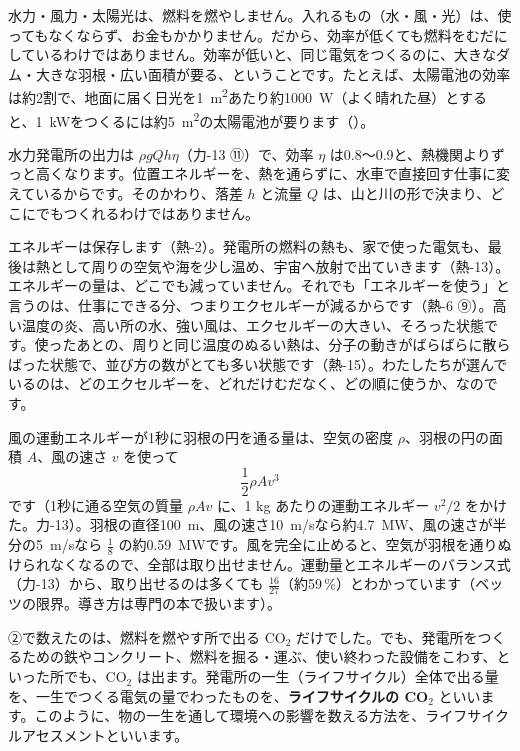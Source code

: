 水力・風力・太陽光は、燃料を燃やしません。入れるもの（水・風・光）は、使ってもなくならず、お金もかかりません。だから、効率が低くても燃料をむだにしているわけではありません。効率が低いと、同じ電気をつくるのに、大きなダム・大きな羽根・広い面積が要る、ということです。たとえば、太陽電池の効率は約2割で、地面に届く日光を\qty{1}{m^2}あたり約\qty{1000}{W}（よく晴れた昼）とすると、\qty{1}{kW}をつくるには約\qty{5}{m^2}の太陽電池が要ります（）。
\begin{phmijika}
水力発電所の出力は $\rho gQh\eta$（力-13 ⑪）で、効率 $\eta$ は0.8〜0.9と、熱機関よりずっと高くなります。位置エネルギーを、熱を通らずに、水車で直接回す仕事に変えているからです。そのかわり、落差 $h$ と流量 $Q$ は、山と川の形で決まり、どこにでもつくれるわけではありません。
\end{phmijika}

エネルギーは保存します（熱-2）。発電所の燃料の熱も、家で使った電気も、最後は熱として周りの空気や海を少し温め、宇宙へ放射で出ていきます（熱-13）。エネルギーの量は、どこでも減っていません。それでも「エネルギーを使う」と言うのは、仕事にできる分、つまりエクセルギーが減るからです（熱-6 ⑨）。高い温度の炎、高い所の水、強い風は、エクセルギーの大きい、そろった状態です。使ったあとの、周りと同じ温度のぬるい熱は、分子の動きがばらばらに散らばった状態で、並び方の数がとても多い状態です（熱-15）。わたしたちが選んでいるのは、どのエクセルギーを、どれだけむだなく、どの順に使うか、なのです。

\begin{motto}[3]
風の運動エネルギーが1秒に羽根の円を通る量は、空気の密度 $\rho$、羽根の円の面積 $A$、風の速さ $v$ を使って
\[\frac{1}{2}\rho Av^3\]
です（1秒に通る空気の質量 $\rho Av$ に、1 kg あたりの運動エネルギー $v^2/2$ をかけた。力-13）。羽根の直径\qty{100}{m}、風の速さ\qty{10}{m/s}なら約\qty{4.7}{MW}、風の速さが半分の\qty{5}{m/s}なら $\tfrac18$ の約\qty{0.59}{MW}です。風を完全に止めると、空気が羽根を通りぬけられなくなるので、全部は取り出せません。運動量とエネルギーのバランス式（力-13）から、取り出せるのは多くても $\tfrac{16}{27}$（約59\,\%）とわかっています（ベッツの限界。導き方は専門の本で扱います）。
\end{motto}

\leavevmode\label{ph:熱-16:sec4}②で数えたのは、燃料を燃やす所で出る CO$_2$ だけでした。でも、発電所をつくるための鉄やコンクリート、燃料を掘る・運ぶ、使い終わった設備をこわす、といった所でも、CO$_2$ は出ます。発電所の一生（ライフサイクル）全体で出る量を、一生でつくる電気の量でわったものを、\textbf{ライフサイクルの CO$_2$} といいます。このように、物の一生を通して環境への影響を数える方法を、ライフサイクルアセスメントといいます。

